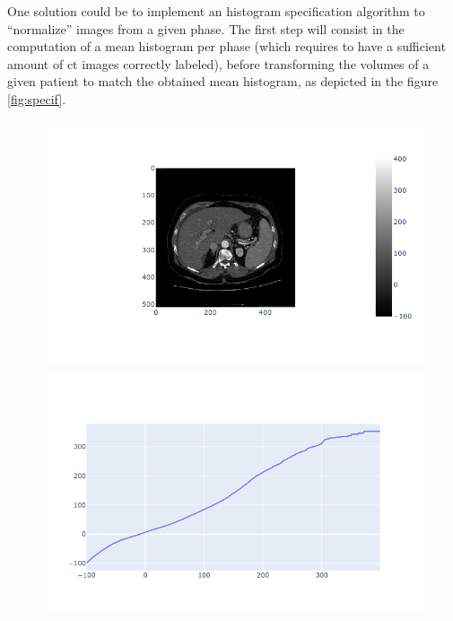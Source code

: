 One solution could be to implement an histogram specification algorithm to ``normalize'' images from a given phase. The first step will consist in the computation of a mean histogram per phase (which requires to have a sufficient amount of \ac{ct} images correctly labeled), before transforming the volumes of a given patient to match the obtained mean histogram, as depicted in the figure \ref{fig:specif}.

\begin{figure}[ht!]
\centering
\begin{minipage}{0.5\linewidth}
\includegraphics[width=\linewidth]{../Perspectives/images/image3.png}
\end{minipage}
\begin{minipage}{0.5\linewidth}
\includegraphics[width=\linewidth]{../Perspectives/images/image1.png}
\end{minipage}
\begin{minipage}{0.5\linewidth}

\end{minipage}
\end{figure}
